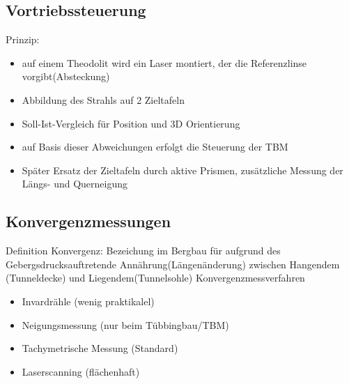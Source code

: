 \documentclass[12pt]{article}
\begin{document}
 \subsection{Vortriebssteuerung}
 Prinzip:
 \begin{itemize}
 	\item auf einem Theodolit wird ein Laser montiert, der die Referenzlinse vorgibt(Absteckung)
 	\item Abbildung des Strahls auf 2 Zieltafeln
 	\item Soll-Ist-Vergleich für Position und 3D Orientierung
 	\item auf Basis dieser Abweichungen erfolgt die Steuerung der TBM
 	\item Später Ersatz der Zieltafeln durch aktive Prismen, zusätzliche Messung der Längs- und Querneigung
 \end{itemize}
\subsection{Konvergenzmessungen}
Definition Konvergenz: Bezeichung im Bergbau für aufgrund des Gebergsdrucksauftretende Annährung(Längenänderung) zwischen Hangendem (Tunneldecke) und Liegendem(Tunnelsohle)\newline
Konvergenzmessverfahren
\begin{itemize}
	\item Invardrähle (wenig praktikalel)
	\item Neigungsmessung (nur beim Tübbingbau/TBM)
	\item Tachymetrische Messung (Standard)
	\item Laserscanning (flächenhaft)
\end{itemize}
\end{document}
